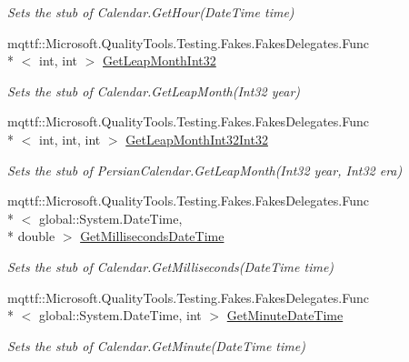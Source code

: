\begin{DoxyCompactItemize}
\begin{DoxyCompactList}\small\item\em Sets the stub of Calendar.\-Get\-Hour(\-Date\-Time time)\end{DoxyCompactList}\item 
mqttf\-::\-Microsoft.\-Quality\-Tools.\-Testing.\-Fakes.\-Fakes\-Delegates.\-Func\\*
$<$ int, int $>$ \hyperlink{class_system_1_1_globalization_1_1_fakes_1_1_stub_persian_calendar_ae1b209b0d993a353c199a534242e7268}{Get\-Leap\-Month\-Int32}
\begin{DoxyCompactList}\small\item\em Sets the stub of Calendar.\-Get\-Leap\-Month(\-Int32 year)\end{DoxyCompactList}\item 
mqttf\-::\-Microsoft.\-Quality\-Tools.\-Testing.\-Fakes.\-Fakes\-Delegates.\-Func\\*
$<$ int, int, int $>$ \hyperlink{class_system_1_1_globalization_1_1_fakes_1_1_stub_persian_calendar_a5d6fb3d495f76c8061f2fb248adf6b44}{Get\-Leap\-Month\-Int32\-Int32}
\begin{DoxyCompactList}\small\item\em Sets the stub of Persian\-Calendar.\-Get\-Leap\-Month(\-Int32 year, Int32 era)\end{DoxyCompactList}\item 
mqttf\-::\-Microsoft.\-Quality\-Tools.\-Testing.\-Fakes.\-Fakes\-Delegates.\-Func\\*
$<$ global\-::\-System.\-Date\-Time, \\*
double $>$ \hyperlink{class_system_1_1_globalization_1_1_fakes_1_1_stub_persian_calendar_aa05c82c28306bf8ad35e9f2290a31549}{Get\-Milliseconds\-Date\-Time}
\begin{DoxyCompactList}\small\item\em Sets the stub of Calendar.\-Get\-Milliseconds(\-Date\-Time time)\end{DoxyCompactList}\item 
mqttf\-::\-Microsoft.\-Quality\-Tools.\-Testing.\-Fakes.\-Fakes\-Delegates.\-Func\\*
$<$ global\-::\-System.\-Date\-Time, int $>$ \hyperlink{class_system_1_1_globalization_1_1_fakes_1_1_stub_persian_calendar_a9ccb041dc8c9aef1aef5aa4cc9334f8a}{Get\-Minute\-Date\-Time}
\begin{DoxyCompactList}\small\item\em Sets the stub of Calendar.\-Get\-Minute(\-Date\-Time time)\end{DoxyCompactList}\item 

\end{DoxyCompactItemize}
